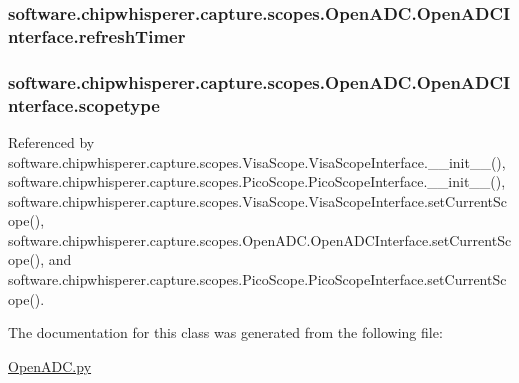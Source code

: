 \subsubsection[{refresh\+Timer}]{\setlength{\rightskip}{0pt plus 5cm}software.\+chipwhisperer.\+capture.\+scopes.\+Open\+A\+D\+C.\+Open\+A\+D\+C\+Interface.\+refresh\+Timer}\label{classsoftware_1_1chipwhisperer_1_1capture_1_1scopes_1_1OpenADC_1_1OpenADCInterface_a65c43aef34e5052d5d1753badacda1df}
\hypertarget{classsoftware_1_1chipwhisperer_1_1capture_1_1scopes_1_1OpenADC_1_1OpenADCInterface_a0636fed74ba2abac0c62c1b11f8e3fbd}{}
\subsubsection[{scopetype}]{\setlength{\rightskip}{0pt plus 5cm}software.\+chipwhisperer.\+capture.\+scopes.\+Open\+A\+D\+C.\+Open\+A\+D\+C\+Interface.\+scopetype}\label{classsoftware_1_1chipwhisperer_1_1capture_1_1scopes_1_1OpenADC_1_1OpenADCInterface_a0636fed74ba2abac0c62c1b11f8e3fbd}


Referenced by software.\+chipwhisperer.\+capture.\+scopes.\+Visa\+Scope.\+Visa\+Scope\+Interface.\+\_\+\+\_\+init\+\_\+\+\_\+(), software.\+chipwhisperer.\+capture.\+scopes.\+Pico\+Scope.\+Pico\+Scope\+Interface.\+\_\+\+\_\+init\+\_\+\+\_\+(), software.\+chipwhisperer.\+capture.\+scopes.\+Visa\+Scope.\+Visa\+Scope\+Interface.\+set\+Current\+Scope(), software.\+chipwhisperer.\+capture.\+scopes.\+Open\+A\+D\+C.\+Open\+A\+D\+C\+Interface.\+set\+Current\+Scope(), and software.\+chipwhisperer.\+capture.\+scopes.\+Pico\+Scope.\+Pico\+Scope\+Interface.\+set\+Current\+Scope().



The documentation for this class was generated from the following file\+:\begin{DoxyCompactItemize}
\item 
\hyperlink{OpenADC_8py}{Open\+A\+D\+C.\+py}\end{DoxyCompactItemize}
